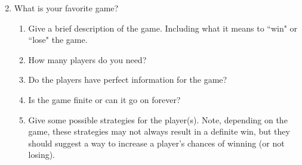 


\vspace{.2in}


\begin{enumerate}
\setcounter{enumi}{1}

\vspace{.1in}

\item What is your favorite game?
\begin{enumerate}
\item Give a brief description of the game. Including what it means to ``win" or ``lose" the game.

\item How many players do you need?

\item Do the players have perfect information for the game?

\item Is the game finite or can it go on forever?

\item Give some possible strategies for the player(s). Note, depending on the game, these strategies may not always result in a definite win, but they should suggest a way to increase a player's chances of winning (or not losing).

\end{enumerate}


\end{enumerate}


 